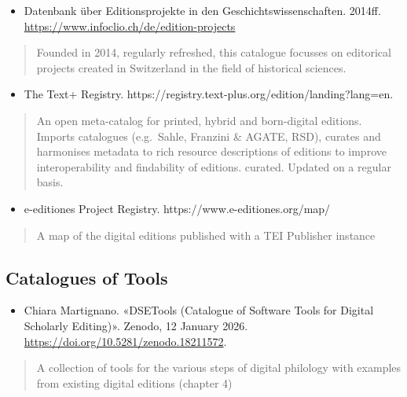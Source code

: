 \documentclass[
  letterpaper,
  DIV=11,
  numbers=noendperiod]{scrreprt}
\providecommand{\tightlist}{%
  \setlength{\itemsep}{0pt}\setlength{\parskip}{0pt}}\usepackage{longtable,booktabs,array}
\begin{document}
\begin{itemize}
\tightlist
\item
  Datenbank über Editionsprojekte in den Geschichtswissenschaften.
  2014ff. \url{https://www.infoclio.ch/de/edition-projects}
\end{itemize}

\begin{quote}
Founded in 2014, regularly refreshed, this catalogue focusses on
editorical projects created in Switzerland in the field of historical
sciences.
\end{quote}

\begin{itemize}
\tightlist
\item
  The Text+ Registry.
  https://registry.text-plus.org/edition/landing?lang=en.
\end{itemize}

\begin{quote}
An open meta-catalog for printed, hybrid and born-digital editions.
Imports catalogues (e.g.~Sahle, Franzini \& AGATE, RSD), curates and
harmonises metadata to rich resource descriptions of editions to improve
interoperability and findability of editions. curated. Updated on a
regular basis.
\end{quote}

\begin{itemize}
\tightlist
\item
  e-editiones Project Registry. https://www.e-editiones.org/map/
\end{itemize}

\begin{quote}
A map of the digital editions published with a TEI Publisher instance
\end{quote}

\subsection{Catalogues of Tools}\label{catalogues-of-tools}

\begin{itemize}
\tightlist
\item
  Chiara Martignano. «DSETools (Catalogue of Software Tools for Digital
  Scholarly Editing)». Zenodo, 12 January 2026.
  \url{https://doi.org/10.5281/zenodo.18211572}.
\end{itemize}

\begin{quote}
A collection of tools for the various steps of digital philology with
examples from existing digital editions (chapter 4)
\end{quote}
\end{document}

